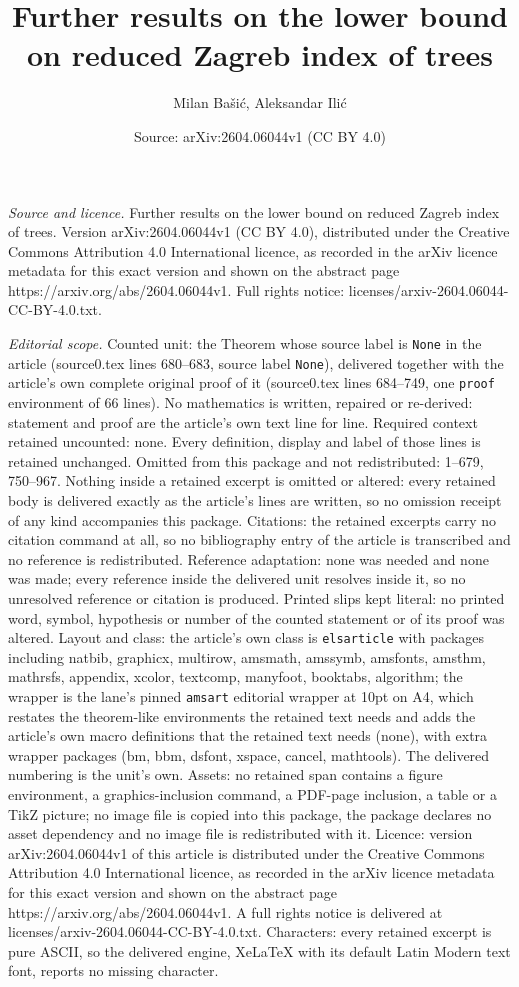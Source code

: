 \documentclass[10pt,a4paper]{amsart}
\title[Further results on the lower bound on reduced Zagreb index o]{Further results on the lower bound on reduced Zagreb index of trees}
\author{Milan Ba\v{s}i\'c, Aleksandar Ili\'c}
\date{Source: arXiv:2604.06044v1 (CC BY 4.0)}
\begin{document}
\maketitle

\noindent\emph{Source and licence.} Further results on the lower bound on reduced Zagreb index of trees. Version arXiv:2604.06044v1 (CC BY 4.0), distributed under the Creative Commons Attribution 4.0 International licence, as recorded in the arXiv licence metadata for this exact version and shown on the abstract page https://arxiv.org/abs/2604.06044v1. Full rights notice: licenses/arxiv-2604.06044-CC-BY-4.0.txt.\par\smallskip

\noindent\textit{Editorial scope.} Counted unit: the Theorem whose source label is \texttt{None} in the article (source0.tex lines 680--683, source label \texttt{None}), delivered together with the article's own complete original proof of it (source0.tex lines 684--749, one \texttt{proof} environment of 66 lines). No mathematics is written, repaired or re-derived: statement and proof are the article's own text line for line. Required context retained uncounted: none. Every definition, display and label of those lines is retained unchanged. Omitted from this package and not redistributed: 1--679, 750--967. Nothing inside a retained excerpt is omitted or altered: every retained body is delivered exactly as the article's lines are written, so no omission receipt of any kind accompanies this package. Citations: the retained excerpts carry no citation command at all, so no bibliography entry of the article is transcribed and no reference is redistributed. Reference adaptation: none was needed and none was made; every reference inside the delivered unit resolves inside it, so no unresolved reference or citation is produced. Printed slips kept literal: no printed word, symbol, hypothesis or number of the counted statement or of its proof was altered. Layout and class: the article's own class is \texttt{elsarticle} with packages including natbib, graphicx, multirow, amsmath, amssymb, amsfonts, amsthm, mathrsfs, appendix, xcolor, textcomp, manyfoot, booktabs, algorithm; the wrapper is the lane's pinned \texttt{amsart} editorial wrapper at 10pt on A4, which restates the theorem-like environments the retained text needs and adds the article's own macro definitions that the retained text needs (none), with extra wrapper packages (bm, bbm, dsfont, xspace, cancel, mathtools). The delivered numbering is the unit's own. Assets: no retained span contains a figure environment, a graphics-inclusion command, a PDF-page inclusion, a table or a TikZ picture; no image file is copied into this package, the package declares no asset dependency and no image file is redistributed with it. Licence: version arXiv:2604.06044v1 of this article is distributed under the Creative Commons Attribution 4.0 International licence, as recorded in the arXiv licence metadata for this exact version and shown on the abstract page https://arxiv.org/abs/2604.06044v1. A full rights notice is delivered at licenses/arxiv-2604.06044-CC-BY-4.0.txt. Characters: every retained excerpt is pure ASCII, so the delivered engine, XeLaTeX with its default Latin Modern text font, reports no missing character.
\end{document}
